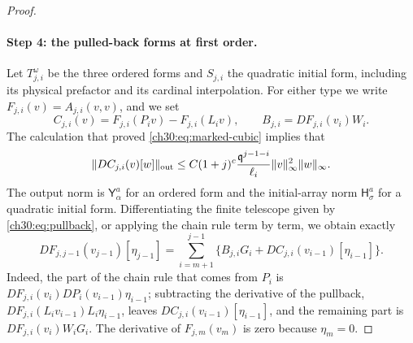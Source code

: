 \begin{proof}
\paragraph{Step 4: the pulled-back forms at first order.} Let $T^\omega_{j,i}$ be the three ordered forms and $S_{j,i}$ the quadratic initial form, including its physical prefactor and its cardinal interpolation. For either type we write $F_{j,i}(v)=A_{j,i}(v,v)$, and we set
\[
 C_{j,i}(v)=F_{j,i}(P_iv)-F_{j,i}(L_iv),\qquad B_{j,i}=DF_{j,i}(v_i)W_i .
\]
The calculation that proved \eqref{ch30:eq:marked-cubic} implies that
\begin{equation}\label{ch30:eq:linear-classical-row}
 \lVert DC_{j,i}(v)[w]\rVert_{\mathrm{out}}\le C(1+j)^c\frac{\mathfrak q^{j-1-i}}{\ell_i}\lVert v\rVert_\infty^2\lVert w\rVert_\infty .
\end{equation}
The output norm is $\mathsf Y_\alpha^a$ for an ordered form and the initial-array norm $\mathsf H_\sigma^a$ for a quadratic initial form. Differentiating the finite telescope given by \eqref{ch30:eq:pullback}, or applying the chain rule term by term, we obtain exactly
\begin{equation}\label{ch30:eq:linear-ancestor-identity}
 DF_{j,j-1}(v_{j-1})[\eta_{j-1}]=\sum_{i=m+1}^{j-1}\bigl\{B_{j,i}G_i+DC_{j,i}(v_{i-1})[\eta_{i-1}]\bigr\}.
\end{equation}
Indeed, the part of the chain rule that comes from $P_i$ is $DF_{j,i}(v_i)DP_i(v_{i-1})\eta_{i-1}$; subtracting the derivative of the pullback, $DF_{j,i}(L_iv_{i-1})L_i\eta_{i-1}$, leaves $DC_{j,i}(v_{i-1})[\eta_{i-1}]$, and the remaining part is $DF_{j,i}(v_i)W_iG_i$. The derivative of $F_{j,m}(v_m)$ is zero because $\eta_m=0$.


\end{proof}
